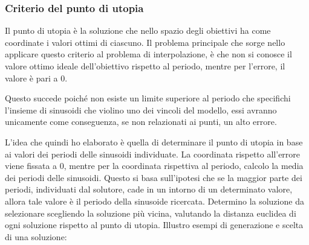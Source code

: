 \documentclass[a4paper,12pt]{report}
\begin{document}
\subsubsection{Criterio del punto di utopia}
\label{ss:utopia}
Il punto di utopia è la soluzione che nello spazio degli obiettivi ha come coordinate i valori ottimi di ciascuno. Il problema principale che sorge nello applicare questo criterio al problema di interpolazione, è che non si conosce il valore ottimo ideale dell'obiettivo rispetto al periodo, mentre per l'errore, il valore è pari a 0.

Questo succede poiché non esiste un limite superiore al periodo che specifichi l'insieme di sinusoidi che violino uno dei vincoli del modello, essi avranno unicamente come conseguenza, se non relazionati ai punti, un alto errore.

L'idea che quindi ho elaborato è quella di determinare il punto di utopia in base ai valori dei periodi delle sinusoidi individuate. La coordinata rispetto all'errore viene fissata a 0, mentre per la coordinata rispettiva al periodo, calcolo la media dei periodi delle sinusoidi. Questo si basa sull'ipotesi che se la maggior parte dei periodi, individuati dal solutore, cade in un intorno di un determinato valore, allora tale valore è il periodo della sinusoide ricercata. Determino la soluzione da selezionare scegliendo la soluzione più vicina, valutando la distanza euclidea di ogni soluzione rispetto al punto di utopia. Illustro esempi di generazione e scelta di una soluzione:
\end{document}
